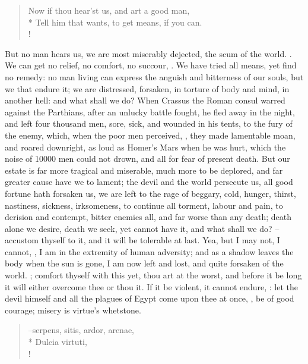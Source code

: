 {\begin{verse}%
Now if thou hear'st us, and art a good man,\\*
Tell him that wants, to get means, if you can.\\!
\end{verse}%

But no man hears us, we are most miserably dejected, the scum of the world. . We can get no relief, no comfort, no succour, . We have tried all means, yet find no remedy: no man living can express the anguish and bitterness of our souls, but we that endure it; we are distressed, forsaken, in torture of body and mind, in another hell: and what shall we do? When Crassus the Roman consul warred against the Parthians, after an unlucky battle fought, he fled away in the night, and left four thousand men, sore, sick, and wounded in his tents, to the fury of the enemy, which, when the poor men perceived, , they made lamentable moan, and roared downright, as loud as Homer's Mars when he was hurt, which the noise of 10\thinspace{}000 men could not drown, and all for fear of present death. But our estate is far more tragical and miserable, much more to be deplored, and far greater cause have we to lament; the devil and the world persecute us, all good fortune hath forsaken us, we are left to the rage of beggary, cold, hunger, thirst, nastiness, sickness, irksomeness, to continue all torment, labour and pain, to derision and contempt, bitter enemies all, and far worse than any death; death alone we desire, death we seek, yet cannot have it, and what shall we do?  --accustom thyself to it, and it will be tolerable at last. Yea, but I may not, I cannot, , I am in the extremity of human adversity; and as a shadow leaves the body when the sun is gone, I am now left and lost, and quite forsaken of the world. ; comfort thyself with this yet, thou art at the worst, and before it be long it will either overcome thee or thou it. If it be violent, it cannot endure, : let the devil himself and all the plagues of Egypt come upon thee at once, , be of good courage; misery is virtue's whetstone.

\begin{latin}
\begin{verse}%
--serpens, sitis, ardor, arenae,\\*
Dulcia virtuti,\\!
\end{verse}%
\end{latin}

}
